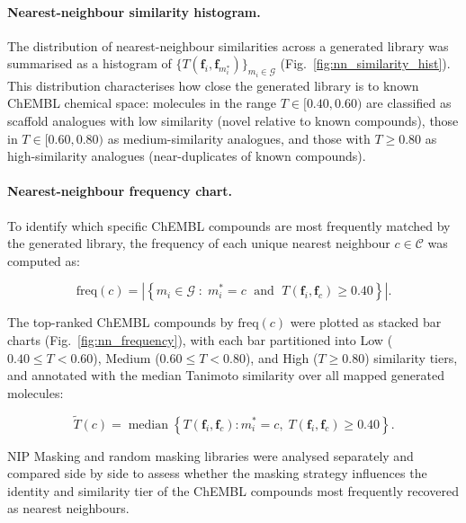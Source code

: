 \documentclass[a4paper,12pt]{article}
\begin{document}
\paragraph{Nearest-neighbour similarity histogram.}
The distribution of nearest-neighbour similarities across a
generated library was summarised as a histogram of
$\{T(\mathbf{f}_i, \mathbf{f}_{m^{*}_i})\}_{m_i \in \mathcal{G}}$
(Fig.~\ref{fig:nn_similarity_hist}).
This distribution characterises how close the generated library is
to known ChEMBL chemical space: molecules in the range
$T \in [0.40, 0.60)$ are classified as scaffold analogues with
low similarity (novel relative to known compounds), those in
$T \in [0.60, 0.80)$ as medium-similarity analogues, and those
with $T \geq 0.80$ as high-similarity analogues (near-duplicates
of known compounds).
 
\paragraph{Nearest-neighbour frequency chart.}
To identify which specific ChEMBL compounds are most frequently
matched by the generated library, the frequency of each unique
nearest neighbour $c \in \mathcal{C}$ was computed as:
 
\begin{equation}
    \text{freq}(c)
    = \left|\left\{
        m_i \in \mathcal{G} \;:\;
        m^{*}_i = c \;\text{ and }\;
        T(\mathbf{f}_i, \mathbf{f}_c) \geq 0.40
      \right\}\right|.
    \label{eq:nn_frequency}
\end{equation}
 
\noindent The top-ranked ChEMBL compounds by $\text{freq}(c)$ were
plotted as stacked bar charts (Fig.~\ref{fig:nn_frequency}), with
each bar partitioned into Low ($0.40 \leq T < 0.60$), Medium
($0.60 \leq T < 0.80$), and High ($T \geq 0.80$) similarity
tiers, and annotated with the median Tanimoto similarity over
all mapped generated molecules:
 
\begin{equation}
    \widetilde{T}(c)
    = \operatorname{median}
      \left\{
          T(\mathbf{f}_i, \mathbf{f}_c) :
          m^{*}_i = c,\;
          T(\mathbf{f}_i, \mathbf{f}_c) \geq 0.40
      \right\}.
    \label{eq:nn_median}
\end{equation}
 
\noindent NIP Masking and random masking libraries were analysed separately
and compared side by side to assess whether the masking strategy
influences the identity and similarity tier of the ChEMBL compounds
most frequently recovered as nearest neighbours.
 
\end{document}
